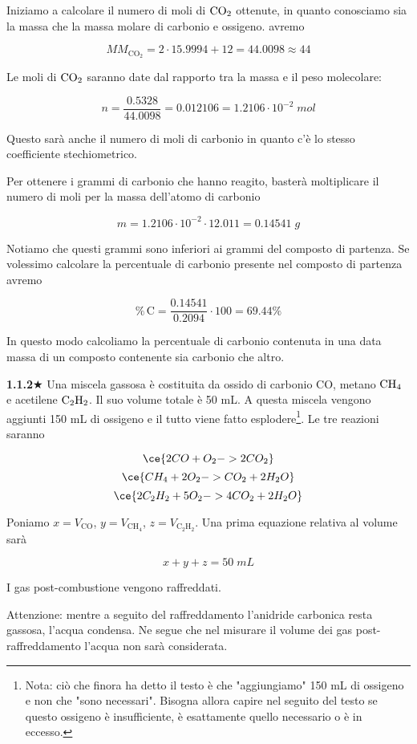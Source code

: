 Iniziamo a calcolare il numero di moli di $\rm CO_2$ ottenute, in quanto conosciamo sia la massa che la massa molare di carbonio e ossigeno. avremo

$$MM_{\text{CO}_2}=2 \cdot 15.9994 + 12 = 44.0098 \approx 44$$

Le moli di $\rm CO_2$ saranno date dal rapporto tra la massa e il peso molecolare:

$$n=\frac{0.5328}{44.0098}=0.012106=1.2106 \cdot 10^{-2} \; mol$$

Questo sarà anche il numero di moli di carbonio in quanto c'è lo stesso coefficiente stechiometrico.

Per ottenere i grammi di carbonio che hanno reagito, basterà moltiplicare il numero di moli per la massa dell'atomo di carbonio

$$m=1.2106 \cdot 10^{-2} \cdot 12.011=0.14541 \; g$$

Notiamo che questi grammi sono inferiori ai grammi del composto di partenza. Se volessimo calcolare la percentuale di carbonio presente nel composto di partenza avremo

$$\%\,\text{C}=\frac{0.14541}{0.2094}\cdot 100 = 69.44 \%$$

In questo modo calcoliamo la percentuale di carbonio contenuta in una data massa di un composto contenente sia carbonio che altro.

\vspace{0.2cm}\textbf{1.1.2}$\bigstar$ Una miscela gassosa è costituita da ossido di carbonio CO, metano $\rm CH_4$ e acetilene $\rm C_2H_2$. Il suo volume totale è 50 mL. A questa miscela vengono aggiunti 150 mL di ossigeno e il tutto viene fatto esplodere\footnote{Nota: ciò che finora ha detto il testo è che "aggiungiamo" 150 mL di ossigeno e non che "sono necessari". Bisogna allora capire nel seguito del testo se questo ossigeno è insufficiente, è esattamente quello necessario o è in eccesso.}. Le tre reazioni saranno

$$\ce{2CO + O_2 -> 2CO_2}$$
$$\ce{CH_4 + 2O_2 -> CO_2 + 2H_2O}$$
$$\ce{2C_2H_2 + 5O_2 -> 4CO_2 + 2H_2O}$$

Poniamo $x=V_{\text{CO}}$, $y=V_{\text{CH}_4}$, $z=V_{\text{C}_2\text{H}_2}$. Una prima equazione relativa al volume sarà

$$x+y+z=50 \; mL$$

I gas post-combustione vengono raffreddati.

Attenzione: mentre a seguito del raffreddamento l'anidride carbonica resta gassosa, l'acqua condensa. Ne segue che nel misurare il volume dei gas post-raffreddamento l'acqua non sarà considerata.

